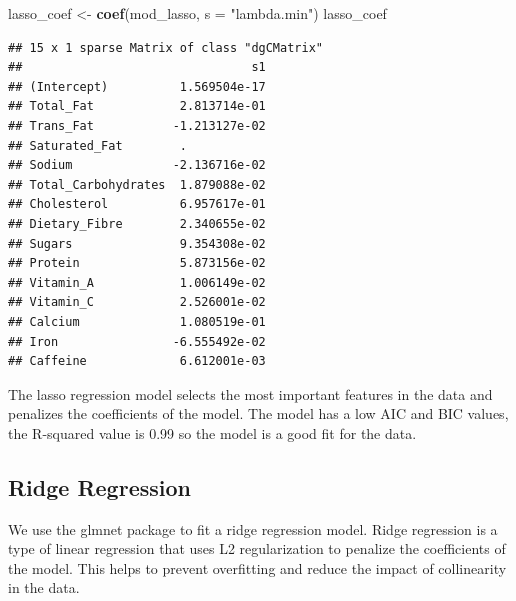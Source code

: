 \documentclass[
]{article}
\newenvironment{Shaded}{\begin{snugshade}}{\end{snugshade}}
\newcommand{\AttributeTok}[1]{\textcolor[rgb]{0.13,0.29,0.53}{#1}}
\newcommand{\ConstantTok}[1]{\textcolor[rgb]{0.56,0.35,0.01}{#1}}
\newcommand{\DecValTok}[1]{\textcolor[rgb]{0.00,0.00,0.81}{#1}}
\newcommand{\FunctionTok}[1]{\textcolor[rgb]{0.13,0.29,0.53}{\textbf{#1}}}
\newcommand{\NormalTok}[1]{#1}
\newcommand{\OtherTok}[1]{\textcolor[rgb]{0.56,0.35,0.01}{#1}}
\newcommand{\SpecialCharTok}[1]{\textcolor[rgb]{0.81,0.36,0.00}{\textbf{#1}}}
\newcommand{\StringTok}[1]{\textcolor[rgb]{0.31,0.60,0.02}{#1}}
\begin{document}
\begin{Shaded}
\begin{Highlighting}[]
\NormalTok{lasso\_coef }\OtherTok{\textless{}{-}} \FunctionTok{coef}\NormalTok{(mod\_lasso, }\AttributeTok{s =} \StringTok{"lambda.min"}\NormalTok{)}
\NormalTok{lasso\_coef}
\end{Highlighting}
\end{Shaded}

\begin{verbatim}
## 15 x 1 sparse Matrix of class "dgCMatrix"
##                                s1
## (Intercept)          1.569504e-17
## Total_Fat            2.813714e-01
## Trans_Fat           -1.213127e-02
## Saturated_Fat        .           
## Sodium              -2.136716e-02
## Total_Carbohydrates  1.879088e-02
## Cholesterol          6.957617e-01
## Dietary_Fibre        2.340655e-02
## Sugars               9.354308e-02
## Protein              5.873156e-02
## Vitamin_A            1.006149e-02
## Vitamin_C            2.526001e-02
## Calcium              1.080519e-01
## Iron                -6.555492e-02
## Caffeine             6.612001e-03
\end{verbatim}

The lasso regression model selects the most important features in the
data and penalizes the coefficients of the model. The model has a low
AIC and BIC values, the R-squared value is 0.99 so the model is a good
fit for the data.

\subsection{Ridge Regression}\label{ridge-regression}

We use the glmnet package to fit a ridge regression model. Ridge
regression is a type of linear regression that uses L2 regularization to
penalize the coefficients of the model. This helps to prevent
overfitting and reduce the impact of collinearity in the data.

\begin{Shaded}
\end{Shaded}
\end{document}
